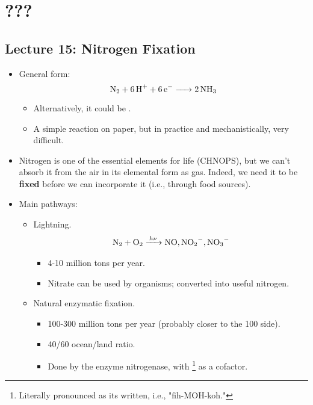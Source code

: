 \documentclass[../notes.tex]{subfiles}
\begin{document}
\chapter{???}
\section{Lecture 15: Nitrogen Fixation}
\begin{itemize}
    \item {}General form:
    \begin{equation*}
        \ce{N2 + 6H+ + 6e- -> 2NH3}
    \end{equation*}
    \begin{itemize}
        \item Alternatively, it could be .
        \item A simple reaction on paper, but in practice and mechanistically, very difficult.
    \end{itemize}
    \item Nitrogen is one of the essential elements for life (CHNOPS), but we can't absorb it from the air in its elemental form as  gas. Indeed, we need it to be \textbf{fixed} before we can incorporate it (i.e., through food sources).
    \item Main pathways:
    \begin{itemize}
        \item Lightning.
        \begin{align*}
            \ce{N2 + O2 ->[$h\nu$] NO, NO2^-, NO3-}
        \end{align*}
        \begin{itemize}
            \item 4-10 million tons per year.
            \item Nitrate can be used by organisms; converted into useful nitrogen.
        \end{itemize}
        \item Natural enzymatic fixation.
        \begin{itemize}
            \item 100-300 million tons per year (probably closer to the 100 side).
            \item 40/60 ocean/land ratio.
            \item Done by the enzyme nitrogenase, with \footnote{Literally pronounced as its written, i.e., "fih-MOH-koh."} as a cofactor.
        \end{itemize}

\end{itemize}
\end{itemize}
\end{document}
